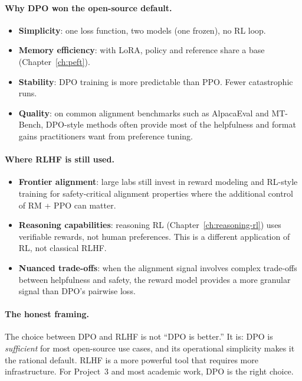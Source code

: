 \paragraph{Why DPO won the open-source default.}

\begin{itemize}[nosep]
  \item \textbf{Simplicity}: one loss function, two models (one frozen), no RL loop.
  \item \textbf{Memory efficiency}: with LoRA, policy and reference share a base (Chapter~\ref{ch:peft}).
  \item \textbf{Stability}: DPO training is more predictable than PPO. Fewer catastrophic runs.
  \item \textbf{Quality}: on common alignment benchmarks such as AlpacaEval and MT-Bench, DPO-style methods often provide most of the helpfulness and format gains practitioners want from preference tuning.
\end{itemize}

\paragraph{Where RLHF is still used.}

\begin{itemize}[nosep]
  \item \textbf{Frontier alignment}: large labs still invest in reward modeling and RL-style training for safety-critical alignment properties where the additional control of RM + PPO can matter.
  \item \textbf{Reasoning capabilities}: reasoning RL (Chapter~\ref{ch:reasoning-rl}) uses verifiable rewards, not human preferences. This is a different application of RL, not classical RLHF.
  \item \textbf{Nuanced trade-offs}: when the alignment signal involves complex trade-offs between helpfulness and safety, the reward model provides a more granular signal than DPO's pairwise loss.
\end{itemize}

\paragraph{The honest framing.} The choice between DPO and RLHF is not ``DPO is better.'' It is: DPO is \emph{sufficient} for most open-source use cases, and its operational simplicity makes it the rational default. RLHF is a more powerful tool that requires more infrastructure. For Project~3 and most academic work, DPO is the right choice.

